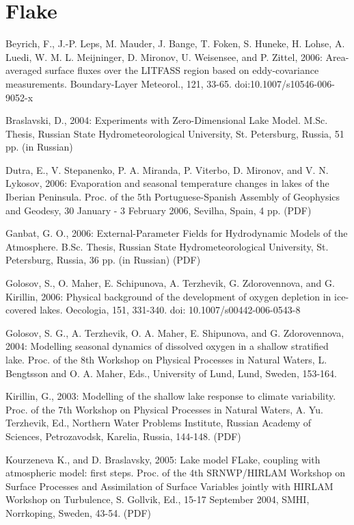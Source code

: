 \section{Flake}
\begin{description}

\item
Beyrich, F., J.-P. Leps, M. Mauder, J. Bange, T. Foken, S. Huneke, H. Lohse, A. Luedi, W. M. L. Meijninger, D. Mironov, U. Weisensee, and P. Zittel, 2006: Area-averaged surface fluxes over the LITFASS region based on eddy-covariance measurements. Boundary-Layer Meteorol., 121, 33-65. doi:10.1007/s10546-006-9052-x 
\item
Braslavski, D., 2004: Experiments with Zero-Dimensional Lake Model. M.Sc. Thesis, Russian State Hydrometeorological University, St. Petersburg, Russia, 51 pp. (in Russian) 
\item
Dutra, E., V. Stepanenko, P. A. Miranda, P. Viterbo, D. Mironov, and V. N. Lykosov, 2006: Evaporation and seasonal temperature changes in lakes of the Iberian Peninsula. Proc. of the 5th Portuguese-Spanish Assembly of Geophysics and Geodesy, 30 January - 3 February 2006, Sevilha, Spain, 4 pp. (PDF)
\item
Ganbat, G. O., 2006: External-Parameter Fields for Hydrodynamic Models of the Atmosphere. B.Sc. Thesis, Russian State Hydrometeorological University, St. Petersburg, Russia, 36 pp. (in Russian) (PDF) 
\item
Golosov, S., O. Maher, E. Schipunova, A. Terzhevik, G. Zdorovennova, and G. Kirillin, 2006: Physical background of the development of oxygen depletion in ice-covered lakes. Oecologia, 151, 331-340. doi: 10.1007/s00442-006-0543-8 
\item
Golosov, S. G., A. Terzhevik, O. A. Maher, E. Shipunova, and G. Zdorovennova, 2004: Modelling seasonal dynamics of dissolved oxygen in a shallow stratified lake. Proc. of the 8th Workshop on Physical Processes in Natural Waters, L. Bengtsson and O. A. Maher, Eds., University of Lund, Lund, Sweden, 153-164.   
\item
Kirillin, G., 2003: Modelling of the shallow lake response to climate variability. Proc. of the 7th Workshop on Physical Processes in Natural Waters, A. Yu. Terzhevik, Ed., Northern Water Problems Institute, Russian Academy of Sciences, Petrozavodsk, Karelia, Russia, 144-148. (PDF)
\item
Kourzeneva K., and D. Braslavsky, 2005: Lake model FLake, coupling with atmospheric model: first steps. Proc. of the 4th SRNWP/HIRLAM Workshop on Surface Processes and Assimilation of Surface Variables jointly with HIRLAM Workshop on Turbulence, S. Gollvik, Ed., 15-17 September 2004, SMHI, Norrkoping, Sweden, 43-54. (PDF) 

\end{description}
